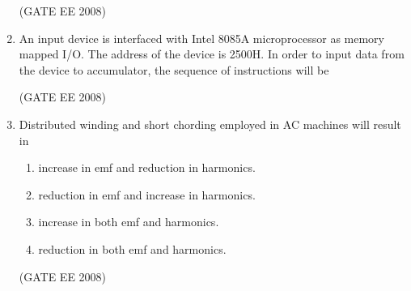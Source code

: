 \documentclass[journal,12pt,onecolumn]{IEEEtran}
\theoremstyle{remark}
\begin{document}
\begin{enumerate}[start=1, label=Q.\arabic*]
\begin{enumerate}
\end{enumerate}
\hfill (GATE EE 2008)





\item An input device is interfaced with Intel 8085A microprocessor as memory mapped I/O. 
The address of the device is {2500H}. In order to input data from the device to accumulator, 
the sequence of instructions will be

\begin{enumerate}
\end{enumerate}
\hfill (GATE EE 2008)



\item Distributed winding and short chording employed in AC machines will result in

\begin{enumerate}
    \item increase in emf and reduction in harmonics.
    \item reduction in emf and increase in harmonics.
    \item increase in both emf and harmonics.
    \item reduction in both emf and harmonics.
\end{enumerate}
\hfill (GATE EE 2008)




\end{enumerate}
\end{document}
